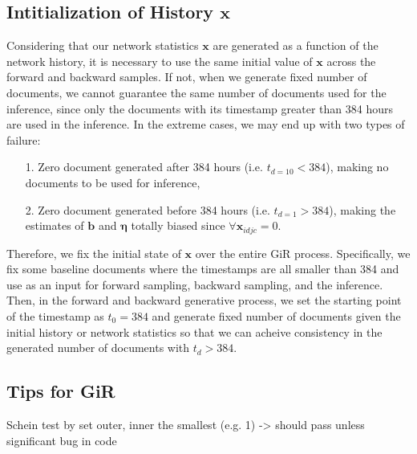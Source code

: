 \documentclass[a4paper]{article}
\begin{document}
        \subsection{Intitialization of History $\boldsymbol{x}$} \label{subsec: Initial history issue}
        Considering that our network statistics $\boldsymbol{x}$ are generated as a function of the network history, it is necessary to use the same initial value of $\boldsymbol{x}$ across the forward and backward samples. If not, when we generate fixed number of documents, we cannot guarantee the same number of documents used for the inference, since only the documents with its timestamp greater than 384 hours are used in the inference. In the extreme cases, we may end up with two types of failure:
        \begin{itemize}
        	\item[1.] Zero document generated after 384 hours (i.e. $t_{d=10}< 384$), making no documents to be used for inference,
        	\item[2.] Zero document generated before 384 hours (i.e. $t_{d=1}> 384$), making the estimates of $\boldsymbol{b}$ and $\boldsymbol{\eta}$ totally biased since $\forall  \boldsymbol{x}_{idjc} = 0$. 
        \end{itemize}
        Therefore, we fix the initial state of $\boldsymbol{x}$ over the entire GiR process. Specifically, we fix some baseline documents where the timestamps are all smaller than 384 and use as an input for forward sampling, backward sampling, and the inference. Then, in the forward and backward generative process, we set the starting point of the timestamp as $t_0= 384$ and generate fixed number of documents given the initial history or network statistics so that we can acheive consistency in the generated number of documents with $t_d > 384$.
  
  
    \subsection{Tips for GiR} \label{subsec: Tips for GiR}
    Schein test by set outer, inner the smallest (e.g. 1)  -> should pass unless significant bug in code   
                
\end{document}
